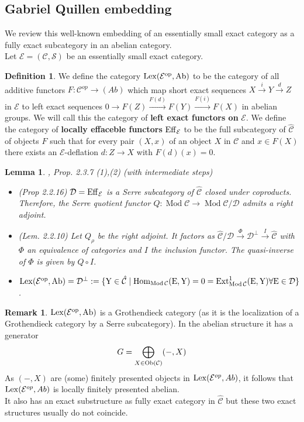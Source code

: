 \documentclass[11pt,a4paper]{amsart}
\theoremstyle{plain}
\newtheorem{lem}[thm]{Lemma}
\theoremstyle{definition}
\newtheorem{dfn}[thm]{Definition}
\newtheorem{rem}[thm]{Remark}
\DeclareMathOperator{\Hom}{Hom}
\DeclareMathOperator{\Ext}{Ext}
\DeclareMathOperator{\Modu}{Mod}
\newcommand{\mcC}{\mathcal{C}}
\newcommand{\mcD}{\mathcal{D}}
\newcommand{\mcE}{\mathcal{E}}
\newcommand{\mcS}{\mathcal{S}}
\begin{document}
\subsection{Gabriel Quillen embedding}

We review this well-known embedding of an essentially small exact category as a fully exact subcategory in an abelian category. \\

Let $\mcE=(\mcC, \mcS)$ be an essentially small exact category. 
\begin{dfn}
We define the category $\rm{Lex} (\mcE^{op}, Ab)$ to be the category of all additive functors $F\colon \mcC^{op} \to (Ab)$ which map short exact sequences $X \xrightarrow{i} Y \xrightarrow{d}Z$ in $\mcE$ to 
left exact sequences $0 \to F(Z) \xrightarrow{F(d)} F(Y) \xrightarrow{F(i)} F(X)$ in abelian groups. We will call this the category of \textbf{left exact functors on} $\mcE$.
We define the category of \textbf{locally effaceble functors} $\rm{Eff}_{\mcE}$ to be the full subcategory of $\hat{\mcC}$ of objects $F$ such that for every pair $(X, x)$ of an object $X$ in $\mcC$ and $x\in F(X)$ there exists an $\mcE$-deflation $d\colon Z \to X$ with $F(d) (x)=0$.  
\end{dfn}


\begin{lem} \cite{Kr-book}, Prop. 2.3.7 (1),(2) (with intermediate steps) 
\begin{itemize}
\item[(i)] (Prop 2.2.16) $\mcD=\rm{Eff}_{\mcE}$ is a Serre subcategory of $\hat{\mcC}$ closed under coproducts. Therefore, the 
Serre quotient functor $Q \colon \Modu \mcC \to \Modu \mcC/\mcD$ admits a right adjoint. 
\item[(ii)] (Lem. 2.2.10) Let $Q_{\rho}$ be the right adjoint. It factors as $\hat{\mcC} /\mcD \xrightarrow{\Phi} \mcD^{\perp} \xrightarrow{I} \hat{\mcC}$ with $\Phi $ an equivalence of categories and $I$ the inclusion functor. The quasi-inverse of $\Phi$ is given by $Q\circ I$. 
\item[(iii)] $\rm{Lex} (\mcE^{op}, Ab)=\mcD^{\perp}:=\{Y \in \hat{\mcC} \mid \Hom_{\Modu \mcC} (E,Y)=0= \Ext^1_{\Modu \mcC}(E,Y) \forall E\in \mcD\}$. 
\end{itemize}
\end{lem}
\begin{rem}
 $\rm{Lex} (\mcE^{op}, Ab)$ is a Grothendieck category (as it is the localization of a Grothendieck category by a Serre subcategory). In the abelian structure it has a generator 
 \[
 G=\bigoplus_{X\in {\rm Ob} (\mcC) } (-,X)
 \]
 As $(-,X)$ are (some) finitely presented objects in ${\rm Lex}(\mcE^{op},Ab)$, it follows that ${\rm Lex}(\mcE^{op},Ab)$ is locally finitely presented abelian. \\ 
 It also has an exact substructure as fully exact category in $\hat{\mcC}$ but these two exact structures usually do not coincide. 
\end{rem}
\end{document}

